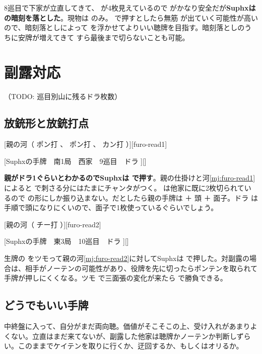 \documentclass[10pt, twocolumn]{article}
\begin{document}
8巡目で下家が立直してきて、 が4枚見えているので  がかなり安全だが\textbf{Suphxは  の暗刻を落とした}\citep[][pp.~44--45]{suphx}。現物は  のみ。 で押すとしたら無筋  が出ていく可能性が高いので、暗刻落としによって  を浮かせてよりいい聴牌を目指す。暗刻落としのうちに安牌が増えてきて  すら最後まで切らないことも可能。


\section{副露対応}

（TODO: 巡目別山に残るドラ枚数）

\subsection{放銃形と放銃打点}

[親の河（ ポン打 、 ポン打 、 カン打 ）][furo-read1]

[Suphxの手牌　南1局　西家　9巡目　ドラ ][]

\textbf{親がドラ1ぐらいとわかるのでSuphxは  で押す}\citep[][pp.~38--39]{suphx}。親の仕掛けと河\ref{mj:furo-read1}によると  で刺さる分にはたまにチャンタがつく。 は他家に既に2枚切られているので  の形にしか振り込まない。だとしたら親の手牌は  ＋ 頭 ＋ 面子。ドラ  は手順で頭になりにくいので、面子で1枚使っているぐらいでしょう。

[親の河（ チー打 ）][furo-read2]

[Suphxの手牌　東3局　10巡目　ドラ ][]

生牌の  をツモって親の河\ref{mj:furo-read2}に対してSuphxは  で押した\citep[][pp.~42--43]{suphx}。対副露の場合は、相手がノーテンの可能性があり、役牌を先に切ったらポンテンを取られて手牌が押しにくくなる。ツモ  で三面張の変化が来たら  で勝負できる。


\subsection{どうでもいい手牌}

中終盤に入って、自分がまだ両向聴。価値がそこそこの上、受け入れがあまりよくない。立直はまだ来てないが、副露した他家は聴牌かノーテンか判断しずらい。このままでケイテンを取りに行くか、迂回するか、もしくはオリるか。
\end{document}
